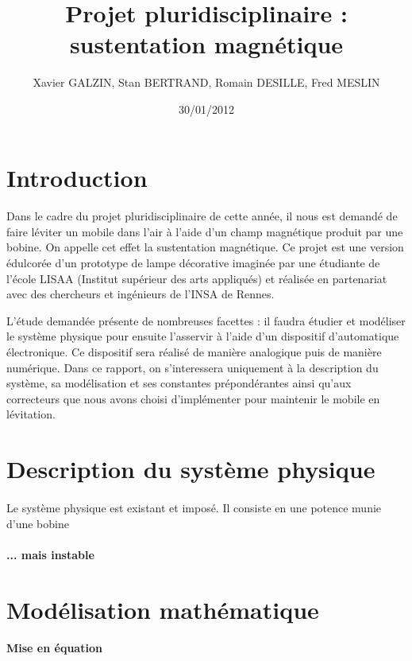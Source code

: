 \documentclass[11pt, french]{article} %
\title{Projet pluridisciplinaire : sustentation magnétique}
\author{ Xavier GALZIN, Stan BERTRAND, Romain DESILLE, Fred MESLIN}
\date{30/01/2012}
\begin{document}
\maketitle
\pagebreak

\section{Introduction}
\paragraph{}
	Dans le cadre du projet pluridisciplinaire de cette année, il nous est demandé de faire léviter un mobile dans l'air à l'aide d'un champ magnétique produit par une bobine. On appelle cet effet la sustentation magnétique. Ce projet est une version édulcorée d'un prototype de lampe décorative imaginée par une étudiante de l'école LISAA (Institut supérieur des arts appliqués) et réalisée en partenariat avec des chercheurs et ingénieurs de l'INSA de Rennes.

L'étude demandée présente de nombreuses facettes : il faudra étudier et modéliser le système physique pour ensuite l'asservir à l'aide d'un dispositif d'automatique électronique. Ce dispositif sera réalisé de manière analogique puis de manière numérique. Dans ce rapport, on s'interessera uniquement à la description du système, sa modélisation et ses constantes prépondérantes ainsi qu'aux correcteurs que nous avons choisi d'implémenter pour maintenir le mobile en lévitation.

\section{Description du système physique}
\paragraph{}
Le système physique est existant et imposé. Il consiste en une potence munie d'une bobine

\paragraph{... mais instable}

\section{Modélisation mathématique}

\paragraph{Mise en équation}
\end{document}
